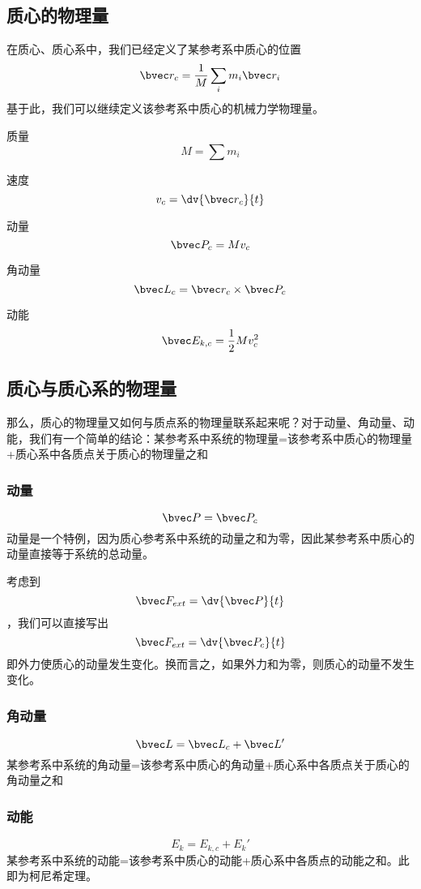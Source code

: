 
\subsection{质心的物理量}
在质心、质心系中，我们已经定义了某参考系中质心的位置
$$\bvec r_c =\frac{1}{M}\sum_i m_i \bvec r_i$$
基于此，我们可以继续定义该参考系中质心的机械力学物理量。

质量
$$M=\sum m_i$$

速度
$$v_c = \dv{\bvec r_c}{t}$$

动量
$$\bvec P_c=M v_c$$

角动量
$$\bvec L_c = \bvec r_c \times \bvec P_c $$

动能
$$\bvec E_{k,c} = \frac{1}{2} M v_c^2$$

\subsection{质心与质心系的物理量}
那么，质心的物理量又如何与质点系的物理量联系起来呢？对于动量、角动量、动能，我们有一个简单的结论：某参考系中系统的物理量=该参考系中质心的物理量+质心系中各质点关于质心的物理量之和

\subsubsection{动量}
$$\bvec P = \bvec P_c$$
动量是一个特例，因为质心参考系中系统的动量之和为零，因此某参考系中质心的动量直接等于系统的总动量。

考虑到$$\bvec F_{ext} = \dv{\bvec P}{t}$$，我们可以直接写出$$\bvec F_{ext} = \dv{\bvec P_c}{t}$$
即外力使质心的动量发生变化。换而言之，如果外力和为零，则质心的动量不发生变化。

\subsubsection{角动量}
$$\bvec L = \bvec L_c + \bvec L'$$
某参考系中系统的角动量=该参考系中质心的角动量+质心系中各质点关于质心的角动量之和

\subsubsection{动能}
$$E_k = E_{k,c} + E_k'$$
某参考系中系统的动能=该参考系中质心的动能+质心系中各质点的动能之和。此即为柯尼希定理。

